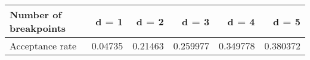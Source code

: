 \begin{tabular}{lrrrrr}
\toprule
Number of breakpoints &    d = 1 &    d = 2 &     d = 3 &     d = 4 &     d = 5 \\
\midrule
      Acceptance rate &  0.04735 &  0.21463 &  0.259977 &  0.349778 &  0.380372 \\
\bottomrule
\end{tabular}
